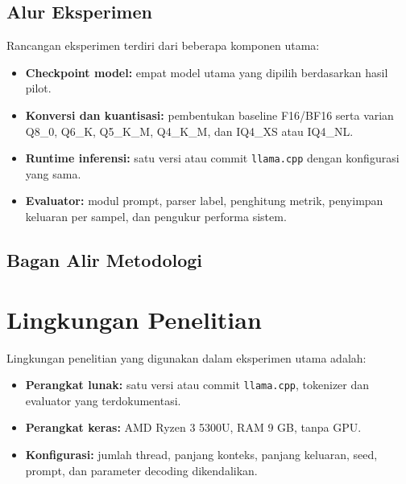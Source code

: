 \subsection{Alur Eksperimen}

Rancangan eksperimen terdiri dari beberapa komponen utama:

\begin{itemize}
    \item \textbf{Checkpoint model:} empat model utama yang dipilih berdasarkan hasil pilot.
    \item \textbf{Konversi dan kuantisasi:} pembentukan baseline F16/BF16 serta varian Q8\_0, Q6\_K, Q5\_K\_M, Q4\_K\_M, dan IQ4\_XS atau IQ4\_NL.
    \item \textbf{Runtime inferensi:} satu versi atau commit \texttt{llama.cpp} dengan konfigurasi yang sama.
    \item \textbf{Evaluator:} modul prompt, parser label, penghitung metrik, penyimpan keluaran per sampel, dan pengukur performa sistem.
\end{itemize}


\subsection{Bagan Alir Metodologi}



\section{Lingkungan Penelitian}

Lingkungan penelitian yang digunakan dalam eksperimen utama adalah:

\begin{itemize}
    \item \textbf{Perangkat lunak:} satu versi atau commit \texttt{llama.cpp}, tokenizer dan evaluator yang terdokumentasi.
    \item \textbf{Perangkat keras:} AMD Ryzen 3 5300U, RAM 9 GB, tanpa GPU.
    \item \textbf{Konfigurasi:} jumlah thread, panjang konteks, panjang keluaran, seed, prompt, dan parameter decoding dikendalikan.
\end{itemize}

